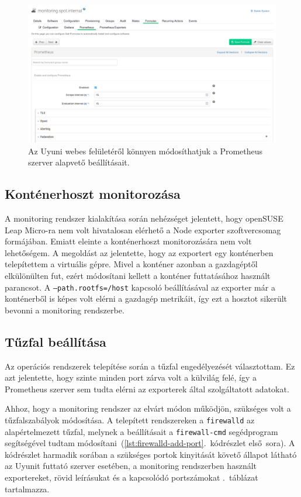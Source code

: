 \begin{figure}[ht]
	\centering
	\includegraphics[width=15cm]{figures/prometheus-formula.png}
	\caption{Az Uyuni webes felületéről könnyen módosíthatjuk a Prometheus szerver alapvető beállításait.}
	\label{fig:prometheus-formula}
\end{figure}

\subsection{Konténerhoszt monitorozása}
A monitoring rendszer kialakítása során nehézséget jelentett, hogy openSUSE Leap Micro-ra nem volt hivatalosan elérhető a Node exporter szoftvercsomag formájában. Emiatt eleinte a konténerhoszt monitorozására nem volt lehetőségem. A megoldást az jelentette, hogy az exportert egy konténerben telepítettem a virtuális gépre. Mivel a konténer azonban a gazdagéptől elkülönülten fut, ezért módosítani kellett a konténer futtatásához használt parancsot. A \texttt{--path.rootfs=/host} kapcsoló beállításával az exporter már a konténerből is képes volt elérni a gazdagép metrikáit, így ezt a hosztot sikerült bevonni a monitoring rendszerbe.

\subsection{Tűzfal beállítása}
Az operációs rendszerek telepítése során a tűzfal engedélyezését választottam. Ez azt jelentette, hogy szinte minden port zárva volt a külvilág felé, így a Prometheus szerver sem tudta elérni az exporterek által szolgáltatott adatokat.

Ahhoz, hogy a monitoring rendszer az elvárt módon működjön, szükséges volt a tűzfalszabályok módosítása. A telepített rendszereken a \texttt{firewalld} az alapértelmezett tűzfal, melynek a beállításait a \texttt{firewall-cmd} segédprogram segítségével tudtam módosítani~(\ref{lst:firewalld-add-port}.~kódrészlet első~sora). A kódrészlet harmadik sorában a szükséges portok kinyitását követő állapot látható az Uyunit futtató szerver esetében, a monitoring rendszerben használt exportereket, rövid leírásukat és a kapcsolódó portszámokat .~táblázat tartalmazza.

